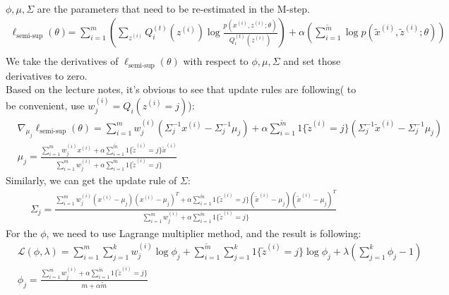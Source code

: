 \begin{answer}\\
$\phi, \mu, \Sigma$ are the parameters that need to be re-estimated in the M-step.
\begin{align*}
    \ell_\text{semi-sup}(\theta) &= \sum_{i=1}^m\left( \sum_{z^{(i)}} Q^{(t)}_i(z^{(i)}) \log \frac{ p(x^{(i)}, z^{(i)};\theta) }{ Q^{(t)}_i(z^{(i)})}\right)  + \alpha \left(\sum_{i=1}^{\tilde{m}} \log p(\tilde{x}^{(i)},\tilde{z}^{(i)};\theta)\right)\\
\end{align*}
We take the derivatives of $\ell_\text{semi-sup}(\theta)$ with respect to $\phi, \mu, \Sigma$ and set those derivatives to zero.\\
Based on the lecture notes, it's obvious to see that update rules are following( to be convenient, use $w^{(i)}_j = Q_i(z^{(i)} = j)$):
\begin{align*}
    &\nabla_{\mu_j} \ell_\text{semi-sup}(\theta)= \sum\limits_{i=1}^m w^{(i)}_j (\Sigma^{-1}_j x^{(i)} - \Sigma^{-1}_j \mu_j) + \alpha \sum\limits_{i=1}^{\tilde{m}}1\{\tilde{z}^{(i)}=j\} (\Sigma^{-1}_j \tilde{x}^{(i)} - \Sigma^{-1}_j \mu_j)\\
    &\mu_j = \frac{\sum\limits_{i=1}^m w^{(i)}_j x^{(i)} + \alpha \sum\limits_{i=1}^{\tilde{m}} 1\{\tilde{z}^{(i)} = j\} \tilde{x}^{(i)}}{\sum\limits_{i=1}^m w^{(i)}_j + \alpha \sum\limits_{i=1}^{\tilde{m}} 1\{\tilde{z}^{(i)} = j\}}
\end{align*}
Similarly, we can get the update rule of $\Sigma$:
\begin{align*}
    \Sigma_j = \frac{\sum\limits_{i=1}^m w^{(i)}_j (x^{(i)} - \mu_j) (x^{(i)} - \mu_j)^T + \alpha \sum\limits_{i=1}^{\tilde{m}} 1\{\tilde{z}^{(i)} = j\}(\tilde{x}^{(i)} - \mu_j)(\tilde{x}^{(i)} - \mu_j)^T}{\sum\limits_{i=1}^m w^{(i)}_j + \alpha \sum\limits_{i=1}^{\tilde{m}} 1\{\tilde{z}^{(i)} = j\}}
\end{align*}
For the $\phi$, we need to use Lagrange multiplier method, and the result is following:
\begin{align*}
    &\mathcal{L}(\phi, \lambda) = \sum\limits_{i=1}^m \sum\limits_{j=1}^k w^{(i)}_j \log \phi_j + \sum\limits_{i=1}^{\tilde{m}}\sum\limits_{j=1}^k 1\{\tilde{z}^{(i)} = j\}\log \phi_j + \lambda (\sum\limits_{j=1}^k \phi_j - 1)\\
    &\phi_j = \frac{\sum\limits_{i=1}^m w^{(i)}_j + \alpha\sum\limits_{i=1}^{\tilde{m}} 1\{\tilde{z}^{(i)} = j\}}{m+\alpha \tilde{m}}
\end{align*}
\end{answer}
